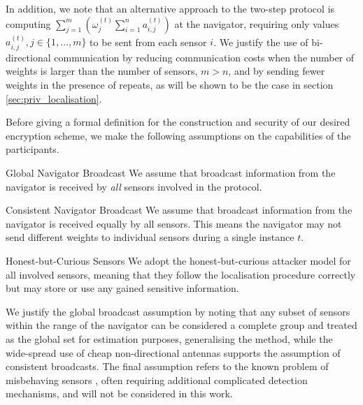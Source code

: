 \documentclass[10pt,letterpaper,oneside,twocolumn,journal]{IEEEtran}
\theoremstyle{definition}
\theoremstyle{definition}
\theoremstyle{remark}
\begin{document}
In addition, we note that an alternative approach to the two-step protocol is computing $\sum^{m}_{j=1}(\omega_j^{(t)}\sum^{n}_{i=1} a_{i,j}^{(t)})$ at the navigator, requiring only values $a_{i,j}^{(t)}, j\in\{1,\dots,m\}$ to be sent from each sensor $i$. We justify the use of bi-directional communication by reducing communication costs when the number of weights is larger than the number of sensors, $m>n$, and by sending fewer weights in the presence of repeats, as will be shown to be the case in section \ref{sec:priv_localisation}.

Before giving a formal definition for the construction and security of our desired encryption scheme, we make the following assumptions on the capabilities of the participants.
\begin{LaTeXdescription}
    \item[Global Navigator Broadcast] We assume that broadcast information from the navigator is received by \textit{all} sensors involved in the protocol.
    \item[Consistent Navigator Broadcast] We assume that broadcast information from the navigator is received equally by all sensors. This means the navigator may not send different weights to individual sensors during a single instance $t$.
    \item[Honest-but-Curious Sensors] We adopt the honest-but-curious attacker model for all involved sensors, meaning that they follow the localisation procedure correctly but may store or use any gained sensitive information.
\end{LaTeXdescription}
We justify the global broadcast assumption by noting that any subset of sensors within the range of the navigator can be considered a complete group and treated as the global set for estimation purposes, generalising the method, while the wide-spread use of cheap non-directional antennas supports the assumption of consistent broadcasts. The final assumption refers to the known problem of misbehaving sensors \cite{lazosSeRLocSecureRangeindependent2004,ben-galOutlierDetection2005}, often requiring additional complicated detection mechanisms, and will not be considered in this work.
\end{document}
